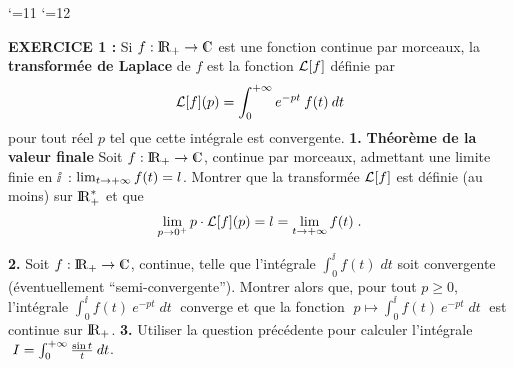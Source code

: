 \documentclass{article}
\begin{document}
\def\boxit#1#2{\setbox1=\hbox{\kern#1{#2}\kern#1}%
\dimen1=\ht1 \advance\dimen1 by #1 \dimen2=\dp1 \advance\dimen2 by #1
\setbox1=\hbox{\vrule height\dimen1 depth\dimen2\box1\vrule}%
\setbox1=\vbox{\hrule\box1\hrule}%
\advance\dimen1 by .4pt \ht1=\dimen1
\advance\dimen2 by .4pt \dp1=\dimen2 \box1\relax}


\catcode`\@=11
\def\system#1{\left\{\null\,\vcenter{\openup1\jot\m@th
\ialign{\strut\hfil$##$&$##$\hfil&&\enspace$##$\enspace&
\hfil$##$&$##$\hfil\crcr#1\crcr}}\right.}
\catcode`\@=12
\pagestyle{empty}
\def\lap#1{{\cal L}[#1]}
\def\DP#1#2{{\partial#1\s\partial#2}}
\def\cala{{\cal A}}
\def\fhat{\widehat{f}}
\let\wh=\widehat
\def\ftilde{\tilde{f}}











\def\lap#1{{\cal L}[#1]}
\def\DP#1#2{{\partial#1\s\partial#2}}



\overfullrule=0mm


\msk
{}
\bsk

{\bf EXERCICE 1 :}\msk
Si $f:\rplus\vers\cmat$ est une fonction continue par morceaux, la {\bf transform\'ee de Laplace} de $f$ est la fonction ${\cal L}[f]$ d\'efinie par\vv
$$\lap{f}(p)=\int_0^{\ii}e^{-pt}\>f(t)\>dt$$
pour tout r\'eel $p$ tel que cette int\'egrale est convergente.
\msk
{\bf 1.} {\bf Th\'eor\`eme de la valeur finale}\pn
Soit $f:\rplus\vers\cmat$, continue par morceaux, admettant une limite finie
en $\ii$~: $\lim_{t\rightarrow+\infty}f(t)=l$.\pn
Montrer que la transform\'ee $\lap{f}$ est d\'efinie (au moins) sur ${\rm I\kern-0.6mm R}_+^*$ et
que\vv
$$\Lim{p}{0^+}p\cdot\lap{f}(p)=l=\Lim{t}{\ii}f(t)\;.$$
\par
{\bf 2.} Soit $f:\rplus\vers\cmat$, continue, telle que l'int\'egrale $\int_0^{\ii}f(t)
\;dt$ soit convergente (\'eventuellement ``semi-convergente''). Montrer alors
que, pour tout $p\ge0$, l'int\'egrale $\int_0^{\ii}f(t)\>e^{-pt}\;dt\;$ converge
et que la fonction $\;p\mapsto\int_0^{\ii}f(t)\>e^{-pt}\;dt\;$ est continue
sur ${\rm I\kern-0.6mm R}_+$.
\msk
{\bf 3.} Utiliser la question pr\'ec\'edente pour calculer l'int\'egrale $\;I=\int_0^{+\infty}{\sin t\over t}\>dt$.
\end{document}
